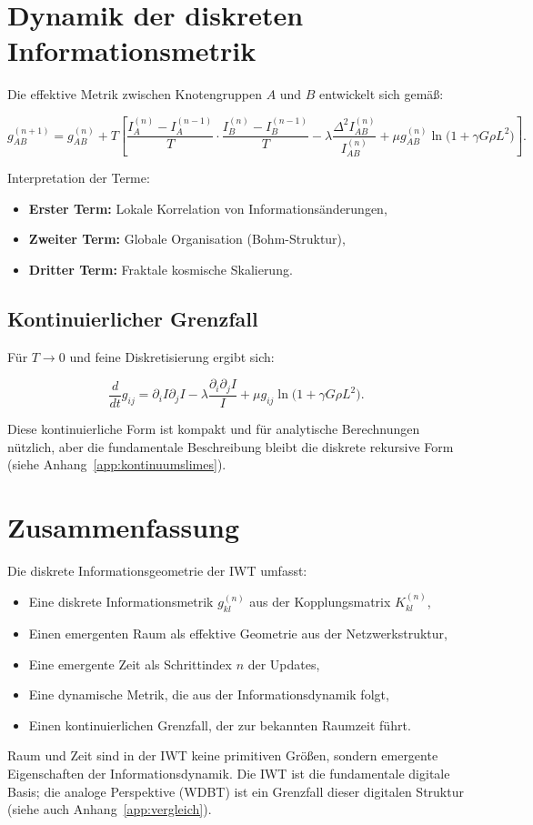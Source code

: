 \section{Dynamik der diskreten Informationsmetrik}
\label{sec:metrik_dynamik}

Die effektive Metrik zwischen Knotengruppen \( A \) und \( B \) entwickelt sich gemäß:

\[
g_{AB}^{(n+1)} = g_{AB}^{(n)} + T \left[ \frac{I_A^{(n)} - I_A^{(n-1)}}{T} \cdot \frac{I_B^{(n)} - I_B^{(n-1)}}{T} - \lambda \frac{\Delta^2 I_{AB}^{(n)}}{I_{AB}^{(n)}} + \mu g_{AB}^{(n)} \ln\!\bigl(1 + \gamma G \rho L^2\bigr) \right].
\]

Interpretation der Terme:

\begin{itemize}
    \item \textbf{Erster Term:} Lokale Korrelation von Informationsänderungen,
    \item \textbf{Zweiter Term:} Globale Organisation (Bohm-Struktur),
    \item \textbf{Dritter Term:} Fraktale kosmische Skalierung.
\end{itemize}

\subsection{Kontinuierlicher Grenzfall}
\label{sub:metrik_kontinuierlicher_grenzfall}

Für \( T \to 0 \) und feine Diskretisierung ergibt sich:

\[
\frac{d}{dt} g_{ij} = \partial_i I \partial_j I - \lambda \frac{\partial_i \partial_j I}{I} + \mu g_{ij} \ln\!\bigl(1 + \gamma G \rho L^2\bigr).
\]

Diese kontinuierliche Form ist kompakt und für analytische Berechnungen nützlich, aber die fundamentale Beschreibung bleibt die diskrete rekursive Form (siehe Anhang~\ref{app:kontinuumslimes}).

\section{Zusammenfassung}
\label{sec:emergenz_zusammenfassung}

Die diskrete Informationsgeometrie der IWT umfasst:

\begin{itemize}
    \item Eine diskrete Informationsmetrik \( g_{kl}^{(n)} \) aus der Kopplungsmatrix \( K_{kl}^{(n)} \),
    \item Einen emergenten Raum als effektive Geometrie aus der Netzwerkstruktur,
    \item Eine emergente Zeit als Schrittindex \( n \) der Updates,
    \item Eine dynamische Metrik, die aus der Informationsdynamik folgt,
    \item Einen kontinuierlichen Grenzfall, der zur bekannten Raumzeit führt.
\end{itemize}

Raum und Zeit sind in der IWT keine primitiven Größen, sondern emergente Eigenschaften der Informationsdynamik. Die IWT ist die fundamentale digitale Basis; die analoge Perspektive (WDBT) ist ein Grenzfall dieser digitalen Struktur (siehe auch Anhang~\ref{app:vergleich}).